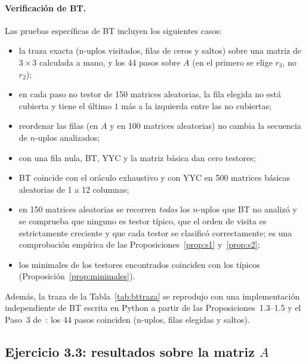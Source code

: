 \documentclass[11pt, a4paper]{article}
\theoremstyle{definition}
\theoremstyle{plain}
\begin{document}
\paragraph{Verificación de BT.} Las pruebas específicas de BT incluyen los siguientes casos:
\begin{itemize}[nosep]
\item la traza exacta (n-uplos visitados, filas de ceros y saltos) sobre una
  matriz de $3\times3$ calculada a mano, y los 44 pasos sobre $A$ (en el
  primero se elige $r_3$, no $r_2$);
\item en cada paso no testor de 150 matrices aleatorias, la fila elegida no está
  cubierta y tiene el último $1$ más a la izquierda entre las no cubiertas;
\item reordenar las filas (en $A$ y en 100 matrices aleatorias) no cambia la
  secuencia de $n$-uplos analizados;
\item con una fila nula, BT, YYC y la matriz básica dan cero testores;
\item BT coincide con el oráculo exhaustivo y con YYC en 500 matrices básicas
  aleatorias de 1 a 12 columnas;
\item en 150 matrices aleatorias se recorren \emph{todos} los $n$-uplos que BT no
  analizó y se comprueba que ninguno es testor típico, que el orden de visita es
  estrictamente creciente y que cada testor se clasificó correctamente; es una
  comprobación empírica de las Proposiciones~\ref{prop:s1} y~\ref{prop:s2};
\item los minimales de los testores encontrados coinciden con los típicos
  (Proposición~\ref{prop:minimales}).
\end{itemize}
Además, la traza de la Tabla~\ref{tab:bttraza} se reprodujo con una
implementación independiente de BT escrita en Python a partir de las
Proposiciones~1.3--1.5 y el Paso~3 de~\cite{algobt}: los 44 pasos coinciden
(n-uplos, filas elegidas y saltos).

\subsection{Ejercicio 3.3: resultados sobre la matriz $A$}

\begin{table}[h]
\centering
\small

\caption{BT sobre la matriz $A$: testores típicos obtenidos y tiempo total de
ejecución (mediana de 10\,000 ejecuciones). La lista completa de los 24 testores
encontrados está en \texttt{docs/resultados/bt\_A.csv}.}
\label{tab:btA}
\end{table}
\end{document}
